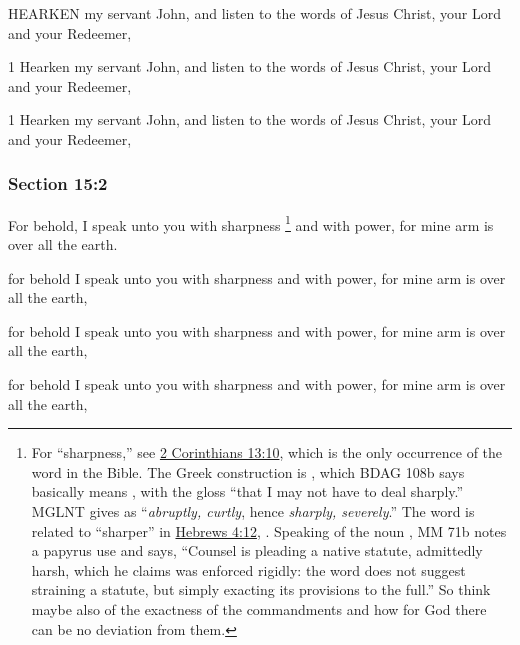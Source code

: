 		\begin{framed}
		\scriptsize
			\begin{compactdesc}
				\item[JSP] HEARKEN my servant John, and listen to the words of Jesus Christ, your Lord and your Redeemer, 
				\item[DC 1835] 1 Hearken my servant John, and listen to the words of Jesus Christ, your Lord and your Redeemer, 
				\item[DC 1844] 1 Hearken my servant John, and listen to the words of Jesus Christ, your Lord and your Redeemer, 
			\end{compactdesc}
		\end{framed}

	\subsubsection{Section 15:2} %
		\label{DC15-2}

		For behold, I speak unto you with sharpness%
			\footnote{%
				For ``sharpness,'' see \hyperref[2CORINTHIANS-13-10]{2 Corinthians 13:10}, which is the only occurrence of the word in the Bible. The Greek construction is , which BDAG 108b says basically means , with the gloss ``that I may not have to deal sharply.'' MGLNT gives  as ``\textit{abruptly, curtly}, hence \textit{sharply, severely}.'' The word is related to ``sharper'' in \hyperref[HEBREWS-4-12]{Hebrews 4:12}, . Speaking of the noun , MM 71b notes a papyrus use and says, ``Counsel is pleading a native statute, admittedly harsh, which he claims was enforced rigidly: the word does not suggest straining a statute, but simply exacting its provisions to the full.'' So think maybe also of the exactness of the commandments and how for God there can be no deviation from them.
				}
		and with power, for mine arm is over all the earth.

		\begin{framed}
		\scriptsize
			\begin{compactdesc}
				\item[JSP] for behold I speak unto you with sharpness and with power, for mine arm is over all the earth, 
				\item[DC 1835] for behold I speak unto you with sharpness and with power, for mine arm is over all the earth, 
				\item[DC 1844] for behold I speak unto you with sharpness and with power, for mine arm is over all the earth, 
			\end{compactdesc}
		\end{framed}

